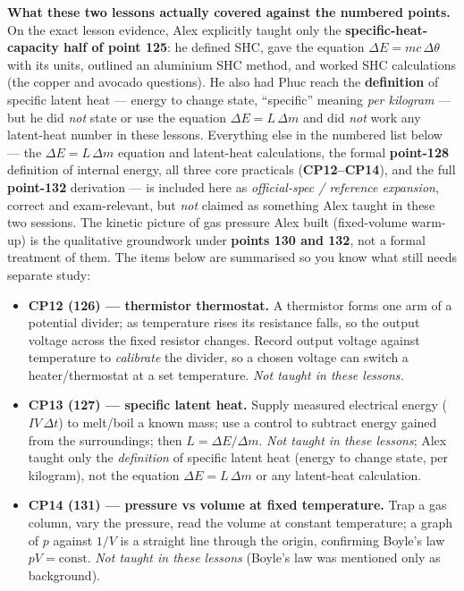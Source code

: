 \documentclass[11pt,a4paper]{article}
\newcommand{\dtheta}{\Delta\theta}
\newcommand{\dE}{\Delta E}
\begin{document}
\begin{plainbox}
\textbf{What these two lessons actually covered against the numbered points.} On the exact
lesson evidence, Alex explicitly taught only the \textbf{specific-heat-capacity half of
point 125}: he defined SHC, gave the equation $\dE = mc\,\dtheta$ with its units, outlined
an aluminium SHC method, and worked SHC calculations (the copper and avocado questions). He
also had Phuc reach the \textbf{definition} of specific latent heat --- energy to change
state, ``specific'' meaning \emph{per kilogram} --- but he did \emph{not} state or use the
equation $\dE = L\,\Delta m$ and did \emph{not} work any latent-heat number in these
lessons. Everything else in the numbered list below --- the $\dE = L\,\Delta m$
equation and latent-heat calculations, the formal \textbf{point-128} definition of internal
energy, all three core practicals (\textbf{CP12--CP14}), and the full \textbf{point-132}
derivation --- is included here as \emph{official-spec / reference expansion}, correct and
exam-relevant, but \emph{not} claimed as something Alex taught in these two sessions. The
kinetic picture of gas pressure Alex built (fixed-volume warm-up) is the qualitative
groundwork under \textbf{points 130 and 132}, not a formal treatment of them. The items
below are summarised so you know what still needs separate study:
\begin{itemize}[leftmargin=1.6em,itemsep=1pt]
  \item \textbf{CP12 (126) --- thermistor thermostat.} A thermistor forms one arm of a
        potential divider; as temperature rises its resistance falls, so the output voltage
        across the fixed resistor changes. Record output voltage against temperature to
        \emph{calibrate} the divider, so a chosen voltage can switch a heater/thermostat at
        a set temperature. \emph{Not taught in these lessons.}
  \item \textbf{CP13 (127) --- specific latent heat.} Supply measured electrical energy
        ($IV\,\Delta t$) to melt/boil a known mass; use a control to subtract energy gained
        from the surroundings; then $L = \dE / \Delta m$. \emph{Not taught in these
        lessons}; Alex taught only the \emph{definition} of specific latent heat
        (energy to change state, per kilogram), not the equation $\dE = L\,\Delta m$ or any
        latent-heat calculation.
  \item \textbf{CP14 (131) --- pressure vs volume at fixed temperature.} Trap a gas column,
        vary the pressure, read the volume at constant temperature; a graph of $p$ against
        $1/V$ is a straight line through the origin, confirming Boyle's law $pV=\text{const}$.
        \emph{Not taught in these lessons} (Boyle's law was mentioned only as background).
\end{itemize}
\end{plainbox}
\end{document}
